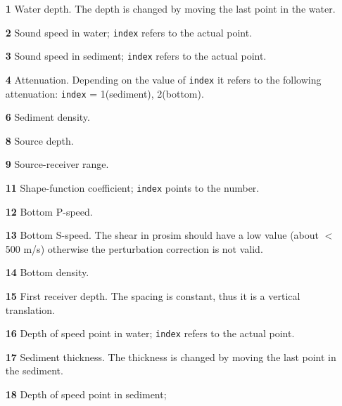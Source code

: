 \documentclass{saclantc}
\begin{document}
\begin{itemize}
    \item[\bf 1]  Water depth. The depth is changed by moving the last 
point in the water.
\vspace{-0.3cm}
    \item[\bf 2] Sound speed in water; {\tt index} refers to the actual point.
\vspace{-0.3cm}
    \item[\bf 3] Sound speed in sediment; {\tt index} refers to the actual point.
\vspace{-0.3cm}
    \item[\bf 4] Attenuation. Depending on the value of  {\tt index}
       it refers to the following attenuation: {\tt index} =
1(sediment), 2(bottom).
\vspace{-0.3cm}
    \item[\bf 6] Sediment density.
\vspace{-0.3cm}
    \item[\bf 8] Source depth.
\vspace{-0.3cm}
    \item[\bf 9] Source-receiver range.
\vspace{-0.3cm}
    \item[\bf 11] Shape-function coefficient; {\tt index} points to the number.
\vspace{-0.3cm}
    \item[\bf 12] Bottom P-speed.
\vspace{-0.3cm}
    \item[\bf 13] Bottom S-speed. The shear in
prosim should have a low value (about $<$ 500 m/s) otherwise
    the perturbation correction is not valid.
\vspace{-0.3cm}
     \item[\bf 14] Bottom density.
\vspace{-0.3cm}
    \item[\bf 15]  First receiver depth. The spacing is constant, 
    thus it is a vertical translation.
\vspace{-0.3cm}
    \item[\bf 16]  Depth of speed point  in water;
               {\tt index} refers to the actual point.
\vspace{-0.3cm}
    \item[\bf 17] Sediment thickness. The thickness is changed by moving the last 
point in the sediment. 
\vspace{-0.3cm}
  \item[\bf 18]  Depth of speed point  in sediment;

\end{itemize}
\end{document}
